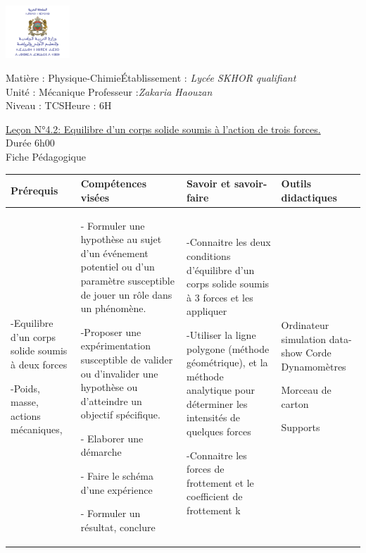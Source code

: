 \documentclass[12pt]{article}
\newcommand\headerMe[2]{\noindent{}#1\hfill#2}
\begin{document}
\begin{center}
\includegraphics[width = 0.18\textwidth]{./img/logoMin.png}
\vspace{-3cm}
\end{center}
\headerMe{Matière : Physique-Chimie}{Établissement : \emph{Lycée SKHOR qualifiant}}\\
\headerMe{ Unité : Mécanique }{  Professeur :\emph{Zakaria Haouzan}}\\
\headerMe{Niveau : TCS}{Heure : 6H}\\

\begin{center}
\underline{Leçon N°4.2: Equilibre d'un corps solide soumis à l'action de trois forces.}\\
Durée 6h00
\\
    \vspace{.2cm}
\hrulefill
\Large{Fiche Pédagogique}
\hrulefill\\
\end{center}


 \begin{center}
	 \begin{tabular}{|p{}||p{}||p{}||p{}|}
\hline
\textbf{Prérequis} & \textbf{Compétences visées } & \textbf{Savoir et savoir-faire}&\textbf{Outils didactiques }\\
    \hline
	 -Equilibre d’un corps solide soumis à deux forces
 
	 -Poids, masse, actions
mécaniques,
				   &
- Formuler une hypothèse au sujet d'un événement potentiel ou d'un paramètre susceptible de jouer un rôle dans un phénomène.

-Proposer une expérimentation susceptible de valider ou d'invalider une hypothèse ou d'atteindre un objectif spécifique.

- Elaborer une démarche

- Faire le schéma d’une expérience

- Formuler un résultat, conclure
				   &
-Connaitre les deux conditions d’équilibre
d’un corps solide soumis à 3 forces et les
appliquer

-Utiliser la ligne polygone (méthode
géométrique), et la méthode analytique pour
déterminer les intensités de quelques forces

-Connaitre les forces de frottement et le
coefficient de frottement k 


 & Ordinateur  simulation data-show 
Corde   Dynamomètres

Morceau de carton

Supports
\\
    \hline
\end{tabular} 
\end{center}
\end{document}
